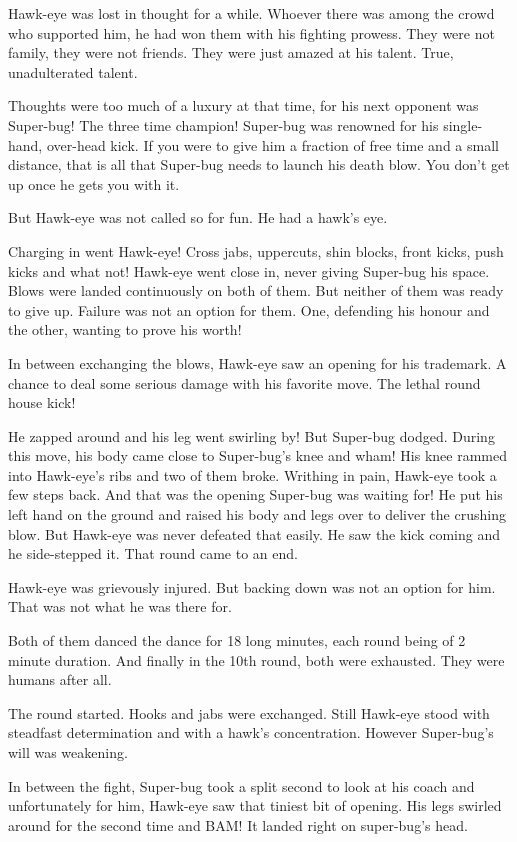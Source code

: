 \documentclass[twoside,11pt]{article}
\begin{document}
Hawk-eye was lost in thought for a while. Whoever there was among the crowd who supported him, he had won them with his fighting prowess. They were not family, they were not friends. They were just amazed at his talent. True, unadulterated talent.

Thoughts were too much of a luxury at that time, for his next opponent was Super-bug! The three time champion! Super-bug was renowned for his single-hand, over-head kick. If you were to give him a fraction of free time and a small distance, that is all that Super-bug needs to launch his death blow. You don't get up once he gets you with it.

But Hawk-eye was not called so for fun. He had a hawk's eye.

Charging in went Hawk-eye! Cross jabs, uppercuts, shin blocks, front kicks, push kicks and what not! Hawk-eye went close in, never giving Super-bug his space. Blows were landed continuously on both of them. But neither of them was ready to give up. Failure was not an option for them. One, defending his honour and the other, wanting to prove his worth!

In between exchanging the blows, Hawk-eye saw an opening for his trademark. A chance to deal some serious damage with his favorite move. The lethal round house kick!

He zapped around and his leg went swirling by! But Super-bug dodged. During this move, his body came close to Super-bug's knee and wham! His knee rammed into Hawk-eye's ribs and two of them broke. Writhing in pain, Hawk-eye took a few steps back. And that was the opening Super-bug was waiting for! He put his left hand on the ground and raised his body and legs over to deliver the crushing blow. But Hawk-eye was never defeated that easily. He saw the kick coming and he side-stepped it. That round came to an end.

Hawk-eye was grievously injured. But backing down was not an option for him. That was not what he was there for.

Both of them danced the dance for 18 long minutes, each round being of 2 minute duration. And finally in the 10th round, both were exhausted. They were humans after all.

The round started. Hooks and jabs were exchanged. Still Hawk-eye stood with steadfast determination and with a hawk's concentration. However Super-bug's will was weakening.

In between the fight, Super-bug took a split second to look at his coach and unfortunately for him, Hawk-eye saw that tiniest bit of opening. His legs swirled around for the second time and BAM! It landed right on super-bug's head.
\end{document}
